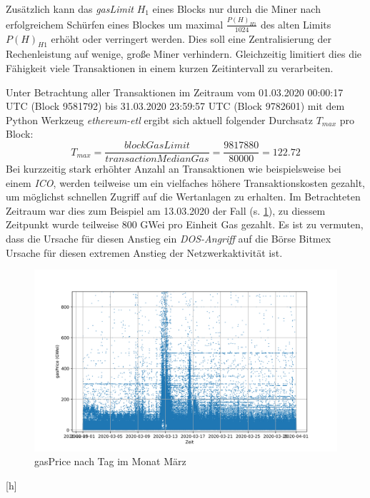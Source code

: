 \documentclass[runningheads]{llncs}
\begin{document}
Zusätzlich kann das \textit{gasLimit} $ H_1 $ eines Blocks nur durch die Miner nach erfolgreichem Schürfen eines Blockes um maximal $ \frac{P(H)_{H1}}{1024} $ des alten Limits  $ P(H)_{H1} $ erhöht oder verringert werden. Dies soll eine Zentralisierung der Rechenleistung auf wenige, große Miner verhindern. Gleichzeitig limitiert dies die Fähigkeit viele Transaktionen in einem kurzen Zeitintervall zu verarbeiten.

Unter Betrachtung aller Transaktionen im Zeitraum vom 01.03.2020 00:00:17 UTC (Block 9581792) bis 31.03.2020 23:59:57 UTC (Block 9782601) mit dem Python Werkzeug \textit{ethereum-etl} \cite{noauthor_blockchain-etl/ethereum-etl_2020} ergibt sich aktuell folgender Durchsatz $ T_{max} $ pro Block: \cite{neemann_appendix_nodate}
$$
  T_{max} = \frac{\textit{blockGasLimit}}{\textit{transactionMedianGas}} = \frac{9817880}{80000} = 122.72
$$
Bei kurzzeitig stark erhöhter Anzahl an Transaktionen wie beispielsweise bei einem \textit{ICO}, werden teilweise um ein vielfaches höhere Transaktionskosten gezahlt, um möglichst schnellen Zugriff auf die Wertanlagen zu erhalten. \cite[S. 9:6 f.]{m.spain_oasics-tokeneconomics_2019} Im Betrachteten Zeitraum war dies zum Beispiel am 13.03.2020 der Fall (s. \ref{transactions_gasprice_timeseries}), zu diessem Zeitpunkt wurde teilweise 800 GWei pro Einheit Gas gezahlt. Es ist zu vermuten, dass die Ursache für diesen Anstieg ein \textit{DOS-Angriff} auf die Börse Bitmex Ursache für diesen extremen Anstieg der Netzwerkaktivität ist. \cite{bitmex_ddos_nodate}
\begin{figure}
  \includegraphics[width=\textwidth, keepaspectratio]{transactions_gasprice_timeseries.png}
  \caption{gasPrice nach Tag im Monat März \cite{neemann_appendix_nodate}}
  \label{transactions_gasprice_timeseries}
\end{figure}[h]
\end{document}
